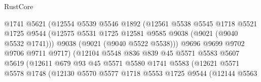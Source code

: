 \begin{lexlean}{RustCore}
\begin{coremodule}
                                  @1741
                                  @5621
                                  (@12554
                                    @5539
                                    @5546
                                    @1892
                                    (@12561
                                      @5538
                                      @5545
                                      @1718
                                      @5521
                                      @1725
                                      @9544
                                      (@12575
                                        @5531
                                        @1725
                                        @12581
                                        @9585
                                        @9038
                                        (@9021 (@9040 @5532 @1741)))
                                      @9038
                                      (@9021 (@9040 @5522 @5538)))
                                    @9696
                                    @9699
                                    @9702
                                    @9706
                                    @9711
                                    @9717)
                                  (@12104
                                    @5548
                                    @836
                                    @839
                                    @45
                                    @5571
                                    @5583
                                    @5607
                                    @5619
                                    (@12611
                                      @679
                                      @93
                                      @45
                                      @5571
                                      @5580
                                      @1741
                                      @5583
                                      (@12621
                                        @5571
                                        @5578
                                        @1748
                                        (@12130
                                          @5570
                                          @5577
                                          @1718
                                          @5553
                                          @1725
                                          @9544
                                          (@12144
                                            @5563

\end{coremodule}
\end{lexlean}
